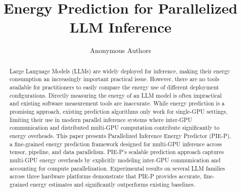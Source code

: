 \documentclass[conference]{IEEEtran}
\newcommand{\sys}{PIE-P}
\begin{document}
\title{Energy Prediction for Parallelized LLM Inference}

%
%
\author{Anonymous Authors}

\maketitle

\begin{abstract}
Large Language Models (LLMs) are widely deployed for inference, making their
energy consumption an increasingly important practical issue. However, there
are no tools available for practitioners to easily compare the energy use of
different deployment configurations.
Directly measuring the energy of an LLM model is often impractical and
existing software measurement tools are inaccurate.
While energy prediction is a promising approach, existing prediction
algorithms only work for single-GPU settings, limiting their use in modern
parallel inference systems where inter-GPU communication and distributed
multi-GPU computation contribute significantly to energy overheads.
This paper presents Parallelized Inference Energy Predictor (\sys{}), a
fine-grained energy prediction framework designed for multi-GPU inference across 
tensor, pipeline, and data parallelism.
\sys{}'s scalable prediction approach captures multi-GPU energy overheads by
explicitly modeling inter-GPU communication and accounting for compute
parallelization.
Experimental results on several LLM families across three hardware platforms
demonstrate that \sys{} provides accurate, fine-grained energy estimates and
significantly outperforms existing baselines.
\end{abstract}
\end{document}

